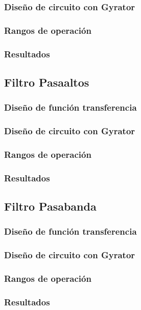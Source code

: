\subsubsection{Dise\~no de circuito con Gyrator}
\subsubsection{Rangos de operaci\'on}
\subsubsection{Resultados}

\subsection{Filtro Pasaaltos}
\subsubsection{Dise\~no de funci\'on transferencia}
\subsubsection{Dise\~no de circuito con Gyrator}
\subsubsection{Rangos de operaci\'on}
\subsubsection{Resultados}

\subsection{Filtro Pasabanda}
\subsubsection{Dise\~no de funci\'on transferencia}
\subsubsection{Dise\~no de circuito con Gyrator}
\subsubsection{Rangos de operaci\'on}
\subsubsection{Resultados}


